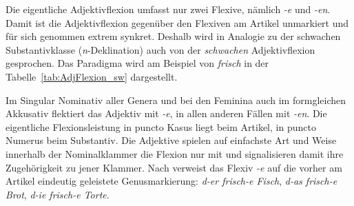 Die eigentliche Adjektivflexion umfasst nur zwei Flexive, nämlich \textit{-e} und \textit{-en}. Damit ist die Adjektivflexion gegenüber den Flexiven am Artikel unmarkiert und für sich genommen extrem synkret. Deshalb wird in Analogie zu der schwachen Substantivklasse (\textit{n}-Deklination) auch von der \textit{schwachen} Adjektivflexion gesprochen. Das Paradigma wird am Beispiel von \textit{frisch} in der Tabelle~\ref{tab:AdjFlexion_sw} dargestellt.

\begin{table}
  \centering
  \caption{Eigentliche (schwache) Adjektivflexion in der Substantivgruppe}
  \label{tab:AdjFlexion_sw}
\end{table}

Im Singular Nominativ aller Genera und bei den Feminina auch im formgleichen Akkusativ flektiert das Adjektiv mit \textit{-e}, in allen anderen Fällen mit \textit{-en}. Die eigentliche Flexionsleistung in puncto Kasus liegt beim Artikel, in puncto Numerus beim Substantiv. Die Adjektive spielen auf einfachste Art und Weise innerhalb der Nominalklammer die Flexion nur mit und signalisieren damit ihre Zugehörigkeit zu jener Klammer. Nach \citet[190--191]{Eisenberg2020_Wort} verweist das Flexiv \textit{-e} auf die vorher am Artikel eindeutig geleistete Genusmarkierung: \textit{d-er frisch-e Fisch}, \textit{d-as frisch-e Brot}, \textit{d-ie frisch-e Torte}.

